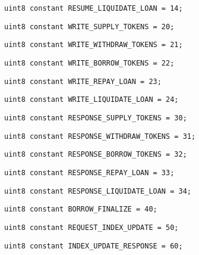 \begin{lstlisting}[firstnumber=14]
    uint8 constant RESUME_LIQUIDATE_LOAN = 14;
\end{lstlisting}

\begin{lstlisting}[firstnumber=16]
    uint8 constant WRITE_SUPPLY_TOKENS = 20;
\end{lstlisting}

\begin{lstlisting}[firstnumber=17]
    uint8 constant WRITE_WITHDRAW_TOKENS = 21;
\end{lstlisting}

\begin{lstlisting}[firstnumber=18]
    uint8 constant WRITE_BORROW_TOKENS = 22;
\end{lstlisting}

\begin{lstlisting}[firstnumber=19]
    uint8 constant WRITE_REPAY_LOAN = 23;
\end{lstlisting}

\begin{lstlisting}[firstnumber=20]
    uint8 constant WRITE_LIQUIDATE_LOAN = 24;
\end{lstlisting}

\begin{lstlisting}[firstnumber=22]
    uint8 constant RESPONSE_SUPPLY_TOKENS = 30;
\end{lstlisting}

\begin{lstlisting}[firstnumber=23]
    uint8 constant RESPONSE_WITHDRAW_TOKENS = 31;
\end{lstlisting}

\begin{lstlisting}[firstnumber=24]
    uint8 constant RESPONSE_BORROW_TOKENS = 32;
\end{lstlisting}

\begin{lstlisting}[firstnumber=25]
    uint8 constant RESPONSE_REPAY_LOAN = 33;
\end{lstlisting}

\begin{lstlisting}[firstnumber=26]
    uint8 constant RESPONSE_LIQUIDATE_LOAN = 34;
\end{lstlisting}

\begin{lstlisting}[firstnumber=28]
    uint8 constant BORROW_FINALIZE = 40;
\end{lstlisting}

\begin{lstlisting}[firstnumber=30]
    uint8 constant REQUEST_INDEX_UPDATE = 50;
\end{lstlisting}

\begin{lstlisting}[firstnumber=32]
    uint8 constant INDEX_UPDATE_RESPONSE = 60;
\end{lstlisting}
